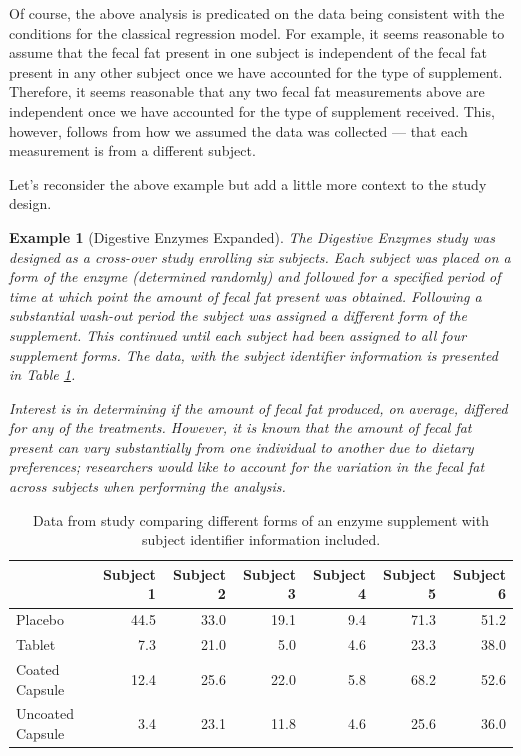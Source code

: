 \documentclass[
]{book}
\theoremstyle{plain}
\theoremstyle{mydefn}
\theoremstyle{myexmpl}
\newtheorem{example}{Example}[chapter]
\theoremstyle{remark}
\begin{document}
Of course, the above analysis is predicated on the data being consistent with the conditions for the classical regression model. For example, it seems reasonable to assume that the fecal fat present in one subject is independent of the fecal fat present in any other subject once we have accounted for the type of supplement. Therefore, it seems reasonable that any two fecal fat measurements above are independent once we have accounted for the type of supplement received. This, however, follows from how we assumed the data was collected --- that each measurement is from a different subject.

Let's reconsider the above example but add a little more context to the study design.

\begin{example}[Digestive Enzymes Expanded]
\protect\hypertarget{exm:rm-enzyme-expanded}{}{\label{exm:rm-enzyme-expanded} {} }The \emph{Digestive Enzymes} study was designed as a cross-over study enrolling six subjects. Each subject was placed on a form of the enzyme (determined randomly) and followed for a specified period of time at which point the amount of fecal fat present was obtained. Following a substantial wash-out period the subject was assigned a different form of the supplement. This continued until each subject had been assigned to all four supplement forms. The data, with the subject identifier information is presented in Table \ref{tab:rm-enzyme-data-table-expanded}.

Interest is in determining if the amount of fecal fat produced, on average, differed for any of the treatments. However, it is known that the amount of fecal fat present can vary substantially from one individual to another due to dietary preferences; researchers would like to account for the variation in the fecal fat across subjects when performing the analysis.
\end{example}

\begin{table}

\caption{\label{tab:rm-enzyme-data-table-expanded}Data from study comparing different forms of an enzyme supplement with subject identifier information included.}
\centering
\begin{tabular}[t]{lrrrrrr}
\toprule
  & Subject 1 & Subject 2 & Subject 3 & Subject 4 & Subject 5 & Subject 6\\
\midrule
Placebo & 44.5 & 33.0 & 19.1 & 9.4 & 71.3 & 51.2\\
Tablet & 7.3 & 21.0 & 5.0 & 4.6 & 23.3 & 38.0\\
Coated Capsule & 12.4 & 25.6 & 22.0 & 5.8 & 68.2 & 52.6\\
Uncoated Capsule & 3.4 & 23.1 & 11.8 & 4.6 & 25.6 & 36.0\\
\bottomrule
\end{tabular}
\end{table}
\end{document}
